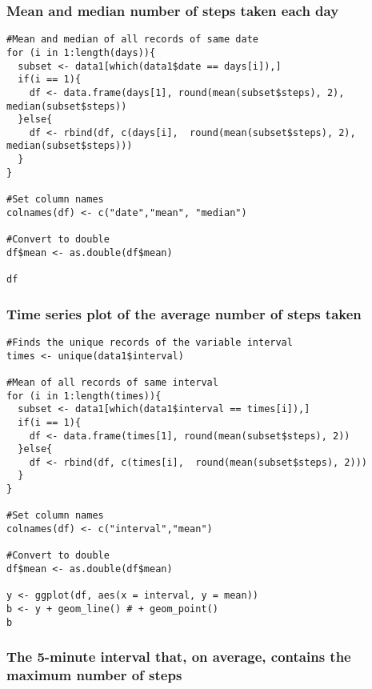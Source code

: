 \documentclass[
]{article}
\begin{document}
\hypertarget{mean-and-median-number-of-steps-taken-each-day}{%
\subsubsection{Mean and median number of steps taken each
day}\label{mean-and-median-number-of-steps-taken-each-day}}

\begin{verbatim}
#Mean and median of all records of same date
for (i in 1:length(days)){
  subset <- data1[which(data1$date == days[i]),]
  if(i == 1){
    df <- data.frame(days[1], round(mean(subset$steps), 2), median(subset$steps))
  }else{
    df <- rbind(df, c(days[i],  round(mean(subset$steps), 2), median(subset$steps)))
  }
}

#Set column names
colnames(df) <- c("date","mean", "median")

#Convert to double
df$mean <- as.double(df$mean)

df
\end{verbatim}

\hypertarget{time-series-plot-of-the-average-number-of-steps-taken}{%
\subsubsection{Time series plot of the average number of steps
taken}\label{time-series-plot-of-the-average-number-of-steps-taken}}

\begin{verbatim}
#Finds the unique records of the variable interval
times <- unique(data1$interval)

#Mean of all records of same interval
for (i in 1:length(times)){
  subset <- data1[which(data1$interval == times[i]),]
  if(i == 1){
    df <- data.frame(times[1], round(mean(subset$steps), 2))
  }else{
    df <- rbind(df, c(times[i],  round(mean(subset$steps), 2)))
  }
}

#Set column names
colnames(df) <- c("interval","mean")

#Convert to double
df$mean <- as.double(df$mean)

y <- ggplot(df, aes(x = interval, y = mean))
b <- y + geom_line() # + geom_point()
b
\end{verbatim}

\hypertarget{the-5-minute-interval-that-on-average-contains-the-maximum-number-of-steps}{%
\subsubsection{The 5-minute interval that, on average, contains the
maximum number of
steps}\label{the-5-minute-interval-that-on-average-contains-the-maximum-number-of-steps}}
\end{document}
